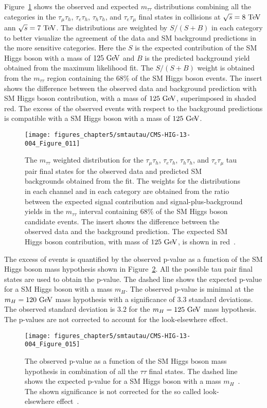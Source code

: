 Figure~\ref{fig:mass_plot} shows the observed and expected $m_{\tau\tau}$ distributions combining all the categories in the $\tau_{\mu}\tau_{h}$, $\tau_{e}\tau_{h}$, $\tau_{h}\tau_{h}$, and $\tau_{e}\tau_{\mu}$ final states in collisions at $\sqrt{s}=8~\mathrm{Te\kern -0.1em V}$ ann $\sqrt{s}=7~\mathrm{Te\kern -0.1em V}$. The distributions are weighted by $S/(S+B)$ in each category to better visualize the agreement of the data and SM background predictions in the more sensitive categories. Here the $S$ is the expected contribution of the SM Higgs boson with a mass of $125~\mathrm{Ge\kern -0.1em V}$ and $B$ is the predicted background yield obtained from the maximum likelihood fit. The $S/(S+B)$ weight is obtained from the $m_{\tau\tau}$ region containing the $68\%$ of the SM Higgs boson events. The insert shows the difference between the observed data and background prediction with SM Higgs boson contribution, with a mass of $125~\mathrm{Ge\kern -0.1em V}$, superimposed in shaded red. The excess of the observed events with respect to the background predictions is compatible with a SM Higgs boson with a mass of $125~\mathrm{Ge\kern -0.1em V}$.
\begin{figure}[htbp]
\centering
\texttt{[image: figures\_chapter5/smtautau/CMS-HIG-13-004\_Figure\_011]}
\caption{The $m_{\tau\tau}$ weighted distribution for the $\tau_{\mu}\tau_{h}$, $\tau_{e}\tau_{h}$, $\tau_{h}\tau_{h}$, and  $\tau_{e}\tau_{\mu}$ tau pair final states for the observed data and predicted SM backgrounds obtained from the fit. The weights for the distributions in each channel and in each category are obtained from the ratio between the expected signal contribution and signal-plus-background yields in the $m_{\tau\tau}$ interval containing $68\%$ of the SM Higgs boson candidate events. The insert shows the difference between the observed data and the background prediction. The expected SM Higgs boson contribution, with mass of $125~\mathrm{Ge\kern -0.1em V}$, is shown in red~\cite{Chatrchyan:2014nva}.}
\label{fig:mass_plot}
\end{figure}

The excess of events is quantified by the observed p-value as a function of the SM Higgs boson mass hypothesis shown in Figure~\ref{fig:money}. All the possible tau pair final states are used to obtain the p-value. The dashed line shows the expected p-value for a SM Higgs boson with a mass $m_{H}$. The observed p-value is minimal at the $m_{H}=120~\mathrm{Ge\kern -0.1em V}$ mass hypothesis with a significance of $3.3$ standard deviations. The observed standard deviation is $3.2$ for the $m_{H}=125~\mathrm{Ge\kern -0.1em V}$ mass hypothesis. The p-values are not corrected to account for the look-elsewhere effect.
\begin{figure}[htbp]
\centering
\texttt{[image: figures\_chapter5/smtautau/CMS-HIG-13-004\_Figure\_015]}
\caption{The observed p-value as a function of the SM Higgs boson mass hypothesis in combination of all the $\tau\tau$ final states. The dashed line shows the expected p-value for a SM Higgs boson with a mass $m_{H}$~\cite{Chatrchyan:2014nva}. The shown significance is not corrected for the so called look-elsewhere effect~\cite{loook}.}
\label{fig:money}
\end{figure}

